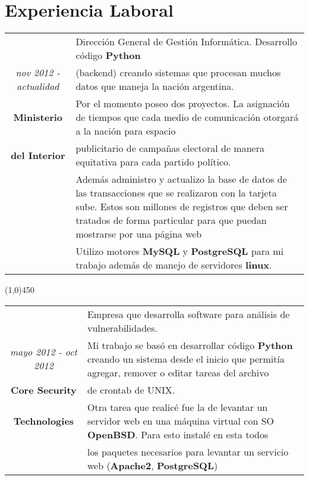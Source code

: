 \section{Experiencia Laboral}

\begin{tabular}{c|p{12.5cm}}
& \large Dirección General de Gestión Informática. Desarrollo código \textbf{Python}\\
\large\textit{nov 2012 - actualidad} &  \large  (backend) creando sistemas que procesan muchos datos que maneja la nación argentina.\\
\large\textbf{Ministerio} & \large  Por el momento poseo dos proyectos. La asignación de tiempos que cada medio de comunicación otorgará a la nación para espacio\\
\large\textbf{del Interior} & \large  publicitario de campañas electoral de manera equitativa para cada partido político.\\
& \large Además administro y actualizo la base de datos de las transacciones que se realizaron con la tarjeta sube. Estos son millones de registros que deben ser tratados de forma particular para que puedan mostrarse por una página web\\
& \large Utilizo motores \textbf{MySQL} y \textbf{PostgreSQL} para mi trabajo además de manejo de servidores \textbf{linux}. \\
\end{tabular}

\begin{center}
\line(1,0){450}
\end{center}
\begin{tabular}{c|p{12.5cm}}
& \large Empresa que desarrolla software para análisis de vulnerabilidades.\\
\large\textit{mayo 2012 - oct 2012} &  \large Mi trabajo se basó en desarrollar código \textbf{Python} creando un sistema desde el inicio que permitía agregar, remover o editar tareas del archivo \\
\large\textbf{Core Security} & \large  de crontab de UNIX.\\
\large\textbf{Technologies} & \large  Otra tarea que realicé fue la de levantar un servidor web en una máquina virtual con SO \textbf{OpenBSD}. Para esto instalé en esta todos\\
& \large los paquetes necesarios para levantar un servicio web (\textbf{Apache2}, \textbf{PostgreSQL}) \\
\end{tabular}

